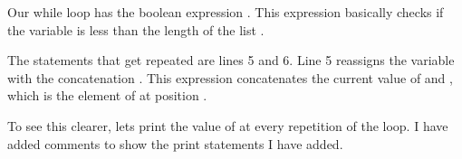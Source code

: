 \documentclass[letterpaper,10pt,english]{jupyterBook}
\begin{document}
\sphinxAtStartPar
Our while loop has the boolean expression . This expression basically checks if the variable  is less than the length of the list .

\sphinxAtStartPar
The statements that get repeated are lines 5 and 6. Line 5 reassigns the variable  with the concatenation . This expression concatenates the current value of  and , which is the element of  at position .

\sphinxAtStartPar
To see this clearer, lets print the value of  at every repetition of the loop. I have added comments to show the print statements I have added.
\end{document}
